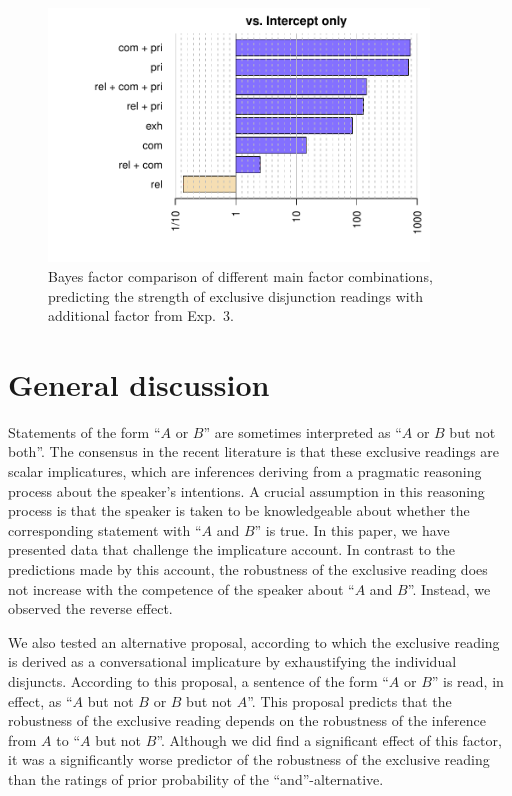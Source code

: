 \documentclass[12pt]{article}
\begin{document}
\begin{figure}
  \centering
  \includegraphics[width=0.9\textwidth]{pics/bfsAllExp4.pdf}
  \caption{Bayes factor comparison of different main factor combinations, predicting the
    strength of exclusive disjunction readings with additional factor \exh from Exp.~3.}
\label{fig:BayesFactorsExp4}
\end{figure}

\section{General discussion}

Statements of the form ``$A$ or $B$'' are sometimes interpreted as ``$A$ or $B$ but not both''. The
consensus in the recent literature is that these exclusive readings are scalar implicatures,
which are inferences deriving from a pragmatic reasoning process about the speaker's
intentions. A crucial assumption in this reasoning process is that the speaker is taken to be
knowledgeable about whether the corresponding statement with ``$A$ and $B$'' is true. In this
paper, we have presented data that challenge the implicature account. In contrast to the
predictions made by this account, the robustness of the exclusive reading does not increase
with the competence of the speaker about ``$A$ and $B$''. Instead, we observed the reverse
effect.

We also tested an alternative proposal, according to which the exclusive reading is derived as
a conversational implicature by exhaustifying the individual disjuncts. According to this proposal, a
sentence of the form ``$A$ or $B$'' is read, in effect, as ``$A$ but not $B$ or $B$ but not $A$''. This proposal predicts that the robustness of the exclusive reading depends on
the robustness of the inference from $A$ to ``$A$ but not $B$''. Although we did find a
significant effect of this factor, it was a significantly worse predictor of the robustness of
the exclusive reading than the ratings of prior probability of the ``and''-alternative.
\end{document}
